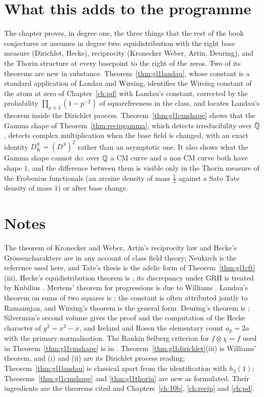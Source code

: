 \section{What this adds to the programme}

The chapter proves, in degree one, the three things that the rest of the book conjectures or assumes in degree two: equidistribution with the right base measure (Dirichlet, Hecke), reciprocity (Kronecker Weber, Artin, Deuring), and the Thorin structure at every basepoint to the right of the zeros. Two of its theorems are new in substance. Theorem~\ref{thm:gl1landau}, whose constant is a standard application of Landau and Wirsing, identifies the Wirsing constant of the atom at zero of Chapter~\ref{ch:pd} with Landau's constant, corrected by the probability $\prod_{p\equiv3}(1-p^{-2})$ of squarefreeness in the class, and locates Landau's theorem inside the Dirichlet process. Theorem~\ref{thm:gl1cmshape} shows that the Gamma shape of Theorem~\ref{thm:recipgamma}, which detects irreducibility over $\mathbb{Q}$, detects complex multiplication when the base field is changed, with an exact identity $D_K^S=(D^S)^2$ rather than an asymptotic one. It also shows what the Gamma shape cannot do: over $\mathbb{Q}$ a CM curve and a non CM curve both have shape $1$, and the difference between them is visible only in the Thorin measure of the Frobenius functionals (an arcsine density of mass $\frac12$ against a Sato Tate density of mass $1$) or after base change.

\section{Notes}

The theorem of Kronecker and Weber, Artin's reciprocity law and Hecke's Gr\"ossencharaktere are in any account of class field theory; Neukirch \cite{neukirch1999} is the reference used here, and Tate's thesis \cite{tate1950} is the adelic form of Theorem~\ref{thm:gl1cft}(iii). Hecke's equidistribution theorem is \cite{hecke1920}; its discrepancy under GRH is treated by Kubilius \cite{kubilius1955}. Mertens' theorem for progressions is due to Williams \cite{williams1974}. Landau's theorem on sums of two squares is \cite{landau1908}; the constant is often attributed jointly to Ramanujan, and Wirsing's theorem \cite{wirsing1961} is the general form. Deuring's theorem is \cite{deuring1953}; Silverman's second volume \cite{silverman1994} gives the proof and the computation of the Hecke character of $y^2=x^3-x$, and Ireland and Rosen \cite{irelandrosen1990} the elementary count $a_p=2a$ with the primary normalisation. The Rankin Selberg criterion for $f\otimes\chi=f$ used in Theorem~\ref{thm:gl1cmshape} is in \cite{iwanieckowalski2004}. Theorem~\ref{thm:gl1dirichlet}(iii) is Williams' theorem, and (i) and (ii) are its Dirichlet process reading; Theorem~\ref{thm:gl1landau} is classical apart from the identification with $h_3(1)$; Theorems~\ref{thm:gl1cmshape} and \ref{thm:gl1thorin} are new as formulated. Their ingredients are the theorems cited and Chapters~\ref{ch:10b}, \ref{ch:recip} and \ref{ch:pd}.

